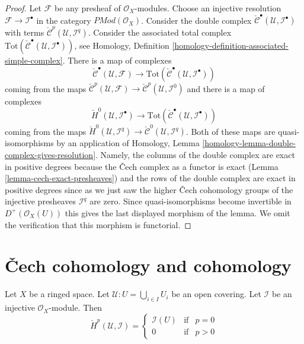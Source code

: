 \begin{proof}
\medskip\noindent
Let $\mathcal{F}$ be any presheaf of $\mathcal{O}_X$-modules.
Choose an injective resolution $\mathcal{F} \to \mathcal{I}^\bullet$
in the category $\textit{PMod}(\mathcal{O}_X)$.
Consider the double complex
$\check{\mathcal{C}}^\bullet(\mathcal{U}, \mathcal{I}^\bullet)$ with terms
$\check{\mathcal{C}}^p(\mathcal{U}, \mathcal{I}^q)$.
Consider the associated total complex
$\text{Tot}(\check{\mathcal{C}}^\bullet(\mathcal{U}, \mathcal{I}^\bullet))$,
see Homology, Definition \ref{homology-definition-associated-simple-complex}.
There is a map of complexes
$$
\check{\mathcal{C}}^\bullet(\mathcal{U}, \mathcal{F})
\longrightarrow
\text{Tot}(\check{\mathcal{C}}^\bullet(\mathcal{U}, \mathcal{I}^\bullet))
$$
coming from the maps
$\check{\mathcal{C}}^p(\mathcal{U}, \mathcal{F})
\to \check{\mathcal{C}}^p(\mathcal{U}, \mathcal{I}^0)$
and there is a map of complexes
$$
\check{H}^0(\mathcal{U}, \mathcal{I}^\bullet)
\longrightarrow
\text{Tot}(\check{\mathcal{C}}^\bullet(\mathcal{U}, \mathcal{I}^\bullet))
$$
coming from the maps
$\check{H}^0(\mathcal{U}, \mathcal{I}^q) \to
\check{\mathcal{C}}^0(\mathcal{U}, \mathcal{I}^q)$.
Both of these maps are quasi-isomorphisms by an application of
Homology, Lemma \ref{homology-lemma-double-complex-gives-resolution}.
Namely, the columns of the double complex are exact in positive degrees
because the {\v C}ech complex as a functor is exact
(Lemma \ref{lemma-cech-exact-presheaves})
and the rows of the double complex are exact in positive degrees
since as we just saw the higher {\v C}ech cohomology groups of the injective
presheaves $\mathcal{I}^q$ are zero.
Since quasi-isomorphisms become invertible
in $D^{+}(\mathcal{O}_X(U))$ this gives the last displayed morphism
of the lemma. We omit the verification that this morphism is
functorial.
\end{proof}





\section{{\v C}ech cohomology and cohomology}
\label{section-cech-cohomology-cohomology}

\begin{lemma}
\label{lemma-injective-trivial-cech}
Let $X$ be a ringed space.
Let $\mathcal{U} : U = \bigcup_{i \in I} U_i$ be an open covering.
Let $\mathcal{I}$ be an injective $\mathcal{O}_X$-module.
Then
$$
\check{H}^p(\mathcal{U}, \mathcal{I}) =
\left\{
\begin{matrix}
\mathcal{I}(U) & \text{if} & p = 0 \\
0 & \text{if} & p > 0
\end{matrix}
\right.
$$
\end{lemma}

